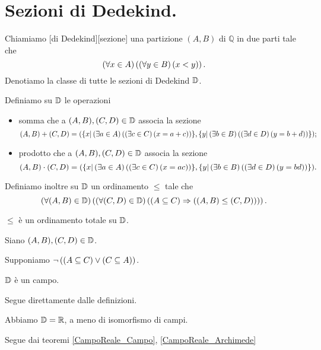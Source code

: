 \section{Sezioni di Dedekind.}
\label{CampoReale_SezioniDiDedekind}
\begin{Definition}
  Chiamiamo
  [di Dedekind][sezione]
  una partizione $(A,B)$ di $\mathbb{Q}$ in due parti tale che
  \[
    \left ( \forall x \in A \right ) \left ( \left ( \forall y \in B \right ) \left ( x < y \right ) \right ).
  \]
  Denotiamo la classe di tutte le sezioni di Dedekind $\mathbb{D}$.
  \par Definiamo su $\mathbb{D}$ le operazioni
  \begin{itemize}
    \item somma che a $(A,B), (C,D) \in \mathbb{D}$ associa la sezione
      \[
        (A,B) + (C,D)
          = (\lbrace x | \left ( \exists a \in A \right ) \left ( \left ( \exists c \in C \right ) \left ( x = a + c \right ) \right ) \rbrace,
          \lbrace y | \left ( \exists b \in B \right ) \left ( \left ( \exists d \in D \right ) \left ( y = b + d \right ) \right ) \rbrace);
      \]
    \item prodotto che a $(A,B), (C,D) \in \mathbb{D}$ associa la sezione
      \[
        (A,B) \cdot (C,D)
          = (\lbrace x | \left ( \exists a \in A \right ) \left ( \left ( \exists c \in C \right ) \left ( x = ac \right ) \right ) \rbrace,
          \lbrace y | \left ( \exists b \in B \right ) \left ( \left ( \exists d \in D \right ) \left ( y = bd \right ) \right ) \rbrace).
      \]
  \end{itemize}
  Definiamo inoltre su $\mathbb{D}$ un ordinamento $\leq$ tale che
  \[
    \left ( \forall (A,B) \in \mathbb{D} \right ) \left ( 
      \left ( \forall (C,D) \in \mathbb{D} \right ) \left ( 
        \left ( A \subseteq C \right ) \Rightarrow \left ( (A,B) \leq (C,D) \right ) \right ) \right ).
  \]
\end{Definition}
\begin{Theorem}
  $\leq$ \`e un ordinamento totale su $\mathbb{D}$.
\end{Theorem}
\Proof Siano $(A,B), (C,D) \in \mathbb{D}$.
\par Supponiamo
$\neg \left ( \left ( A \subseteq C \right ) \vee \left ( C \subseteq A \right ) \right )$.
\begin{Theorem}
  \label{CampoReale_Campo}
  $\mathbb{D}$ \`e un campo.
\end{Theorem}
\Proof Segue direttamente dalle definizioni. \EndProof
\begin{Theorem}
  \label{CampoReale_Archimedeo}
\end{Theorem}
\begin{Theorem}
  Abbiamo $\mathbb{D} = \mathbb{R}$, a meno di isomorfismo di campi.
\end{Theorem}
\Proof Segue dai teoremi \ref{CampoReale_Campo}, \ref{CampoReale_Archimede}
